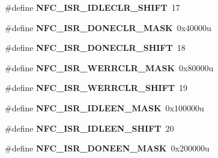 \begin{DoxyCompactItemize}
\item 
\hypertarget{group___n_f_c___register___masks_ga1ecfb954fdeea3f2a2cfaf52c4bdcc65}{}\#define {\bfseries N\+F\+C\+\_\+\+I\+S\+R\+\_\+\+I\+D\+L\+E\+C\+L\+R\+\_\+\+S\+H\+I\+F\+T}~17\label{group___n_f_c___register___masks_ga1ecfb954fdeea3f2a2cfaf52c4bdcc65}

\item 
\hypertarget{group___n_f_c___register___masks_ga223c285299ca4da17afb8852d9a240c9}{}\#define {\bfseries N\+F\+C\+\_\+\+I\+S\+R\+\_\+\+D\+O\+N\+E\+C\+L\+R\+\_\+\+M\+A\+S\+K}~0x40000u\label{group___n_f_c___register___masks_ga223c285299ca4da17afb8852d9a240c9}

\item 
\hypertarget{group___n_f_c___register___masks_gaf64933f5b07573cb5139c97bb63c99d4}{}\#define {\bfseries N\+F\+C\+\_\+\+I\+S\+R\+\_\+\+D\+O\+N\+E\+C\+L\+R\+\_\+\+S\+H\+I\+F\+T}~18\label{group___n_f_c___register___masks_gaf64933f5b07573cb5139c97bb63c99d4}

\item 
\hypertarget{group___n_f_c___register___masks_gaf4efb88456044d18f6427996223aee99}{}\#define {\bfseries N\+F\+C\+\_\+\+I\+S\+R\+\_\+\+W\+E\+R\+R\+C\+L\+R\+\_\+\+M\+A\+S\+K}~0x80000u\label{group___n_f_c___register___masks_gaf4efb88456044d18f6427996223aee99}

\item 
\hypertarget{group___n_f_c___register___masks_ga0b6649949a983fe1c42aee062e0ffafe}{}\#define {\bfseries N\+F\+C\+\_\+\+I\+S\+R\+\_\+\+W\+E\+R\+R\+C\+L\+R\+\_\+\+S\+H\+I\+F\+T}~19\label{group___n_f_c___register___masks_ga0b6649949a983fe1c42aee062e0ffafe}

\item 
\hypertarget{group___n_f_c___register___masks_gae011c49dc4c5c218645970b263651531}{}\#define {\bfseries N\+F\+C\+\_\+\+I\+S\+R\+\_\+\+I\+D\+L\+E\+E\+N\+\_\+\+M\+A\+S\+K}~0x100000u\label{group___n_f_c___register___masks_gae011c49dc4c5c218645970b263651531}

\item 
\hypertarget{group___n_f_c___register___masks_ga672f90ac9d7acaeda7119a61f759cc56}{}\#define {\bfseries N\+F\+C\+\_\+\+I\+S\+R\+\_\+\+I\+D\+L\+E\+E\+N\+\_\+\+S\+H\+I\+F\+T}~20\label{group___n_f_c___register___masks_ga672f90ac9d7acaeda7119a61f759cc56}

\item 
\hypertarget{group___n_f_c___register___masks_ga7f39c36c68352922cbd191c2ca4c63ab}{}\#define {\bfseries N\+F\+C\+\_\+\+I\+S\+R\+\_\+\+D\+O\+N\+E\+E\+N\+\_\+\+M\+A\+S\+K}~0x200000u\label{group___n_f_c___register___masks_ga7f39c36c68352922cbd191c2ca4c63ab}


\end{DoxyCompactItemize}
